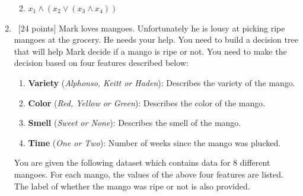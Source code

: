 \documentclass[12pt, fullpage,letterpaper]{article}
\begin{document}
\begin{enumerate}
\begin{enumerate}
\begin{center}
  \end{center}
  \item $x_1 \wedge (x_2 \vee (x_3 \wedge x_4))$
  \begin{center}
  \end{center}
  \end{enumerate}

\item~[24 points] 
  Mark loves mangoes. Unfortunately he is lousy at picking ripe mangoes at the grocery. He needs your help.
  You need to build a decision tree that will help Mark decide if a mango is ripe or not. You need to make the decision based on
  four features described below:
  \begin{enumerate}
  \item\textbf{Variety} (\textit{Alphonso, Keitt or Haden}): Describes the variety of the mango.
  \item\textbf{Color} (\textit{Red, Yellow or Green}): Describes the color of the mango.
  \item\textbf{Smell} (\textit{Sweet or None}): Describes the smell of the mango.
  \item\textbf{Time} (\textit{One or Two}): Number of weeks since the mango was plucked.
  \end{enumerate}

  You are given the following dataset which contains data for 8 different mangoes. For each mango, the values of the above four features
  are listed. The label of whether the mango was ripe or not is also provided.


\end{enumerate}
\end{document}
